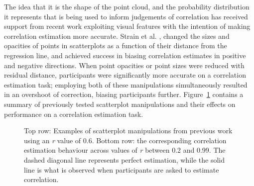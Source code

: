\documentclass[manuscript,screen,review]{acmart}
\begin{document}
The idea that it is the shape of the point cloud, and the probability
distribution it represents that is being used to inform judgements of
correlation has received support from recent work exploiting visual
features with the intention of making correlation estimation more
accurate. Strain et al. \citep{strain_2023, strain_2023b, strain_2024},
changed the sizes and opacities of points in scatterplots as a function
of their distance from the regression line, and achieved success in
biasing correlation estimates in positive and negative directions. When
point opacities \citep{strain_2023} or point sizes \citep{strain_2023b}
were reduced with residual distance, participants were significantly
more accurate on a correlation estimation task; employing both of these
manipulations simultaneously \citep{strain_2024} resulted in an
overshoot of correction, biasing participants further.
Figure~\ref{fig-previous-manipulations} contains a summary of previously
tested scatterplot manipulations and their effects on performance on a
correlation estimation task.

\begin{figure}


\caption{\label{fig-previous-manipulations}Top row: Examples of
scatterplot manipulations from previous work using an \textit{r} value
of 0.6. Bottom row: the corresponding correlation estimation behaviour
across values of \textit{r} between 0.2 and 0.99. The dashed diagonal
line represents perfect estimation, while the solid line is what is
observed when participants are asked to estimate correlation.}

\end{figure}%
\end{document}
